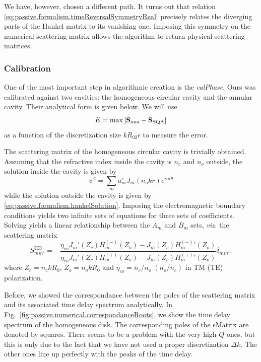 We have, however, chosen a different path. 
It turns out that relation \eqref{eq:passive.formalism.timeReversalSymmetryReal}
precisely relates the diverging parts of the Hankel matrix
to its vanishing one. Imposing this symmetry on the numerical scattering
matrix allows the algorithm to return physical scattering matrices. 

\subsubsection{Calibration}
One of the most important step in algorithmic creation
is the \textit{\gls{calPhase}}. Ours was calibrated
against two cavities: the homogeneous circular cavity and 
the annular cavity. Their analytical form is given below.
We will use 
  \begin{equation}
   E = \max\left[\mathbf{S}_\text{ana}-\mathbf{S}_\text{SQA}\right] 
  \end{equation}
as a function of the discretization size $kR_02\epsilon$ to measure
the error. 

The scattering matrix of the homogeneous circular cavity
is trivially obtained. Assuming that the refractive index inside
the cavity is $n_c$ and $n_o$ outside, the solution inside the 
cavity is given by 
  \begin{equation}
   \psi^c = \sum_m a_m^cJ_m(n_okr)e^{im\theta}
  \end{equation}
while the solution outside the cavity is given by \eqref{eq:passive.formalism.hankelSolution}.
Imposing the electromagnetic boundary conditions yields two infinite sets of equations
for three sets of coefficients. Solving yields a linear relationship between the 
$A_m$ and $B_m$ sets, \textit{viz.} the scattering matrix
  \begin{equation}
   S_{mm'}^\text{HD} = -  \frac{\eta_{co}J_m'(Z_c)H_m^{(-)}(Z_o)-J_m(Z_c){H^{(-)}_m}'(Z_o)}
				{\eta_{co}J_m'(Z_c)H_m^{(+)}(Z_o)-J_m(Z_c){H^{(+)}_m}'(Z_o)}\delta_{mm'}.
  \end{equation}
where $Z_c = n_ckR_0$, $Z_o=n_okR_0$ and $\eta_{co}= n_c/n_o\; (n_o/n_c)$ in TM (TE) polarization.

Before, we showed the correspondance between the poles of the scattering matrix and its associated
time delay spectrum analytically. In Fig.~\ref{fig:passive.numerical.correspondanceRoots}, we show the
time delay spectrum of the homogeneous disk. The corresponding poles of the \gls{sMatrix} are denoted
by squares. There seems to be a problem with the very high-$Q$ ones, but this is only due to the fact
that we have not used a proper discretization $\Delta k$. The other ones line up perfectly with the peaks
of the time delay. 

